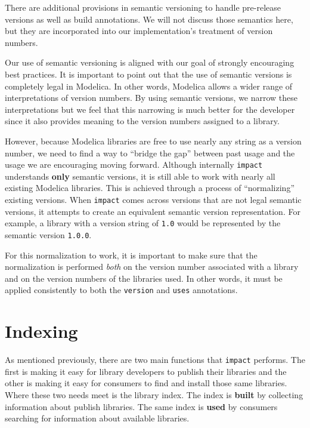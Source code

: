 \documentclass[11pt,a4paper,twocolumn]{article}
\newcommand{\code}[1]{\texttt{#1}} %
\begin{document}
There are additional provisions in semantic versioning to handle
pre-release versions as well as build annotations.  We will not
discuss those semantics here, but they are incorporated into our
implementation's treatment of version numbers.

Our use of semantic versioning is aligned with our goal of strongly
encouraging best practices.  It is important to point out that the use
of semantic versions is completely legal in Modelica.  In other words,
Modelica allows a wider range of interpretations of version numbers.
By using semantic versions, we narrow these interpretations but we
feel that this narrowing is much better for the developer since it
also provides meaning to the version numbers assigned to a library.

However, because Modelica libraries are free to use nearly any string
as a version number, we need to find a way to ``bridge the gap''
between past usage and the usage we are encouraging moving forward.
Although internally \code{impact} understands \textbf{only} semantic
versions, it is still able to work with nearly all existing Modelica
libraries.  This is achieved through a process of ``normalizing''
existing versions.  When \code{impact} comes across versions that are
not legal semantic versions, it attempts to create an equivalent
semantic version representation.  For example, a library with a
version string of \code{1.0} would be represented by the semantic
version \code{1.0.0}.

For this normalization to work, it is important to make sure that the
normalization is performed \emph{both} on the version number associated
with a library and on the version numbers of the libraries used.  In
other words, it must be applied consistently to both the
\code{version} and \code{uses} annotations.

\section{Indexing}

As mentioned previously, there are two main functions that
\code{impact} performs.  The first is making it easy for library
developers to publish their libraries and the other is making it easy
for consumers to find and install those same libraries.  Where these
two needs meet is the library index.  The index is \textbf{built} by
collecting information about publish libraries.  The same index is
\textbf{used} by consumers searching for information about available
libraries.
\end{document}

